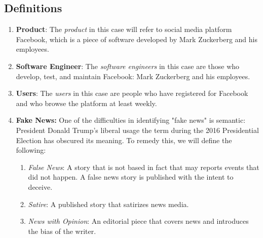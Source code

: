 
\subsection{Definitions}

\begin{enumerate}

\item{\textbf{Product}: The \emph{product} in this case will refer to social media platform Facebook, which is a piece of software developed by Mark Zuckerberg and his employees.
}

\item{\textbf{Software Engineer}: The \emph{software engineers} in this case are those who develop, test, and maintain Facebook: Mark Zuckerberg and his employees.
}

\item{\textbf{Users}: The \emph{users} in this case are people who have registered for Facebook and who browse the platform at least weekly.
}

\item{\textbf{Fake News:} One of the difficulties in identifying "fake news" is semantic: President Donald Trump's liberal usage the term during the 2016 Presidential Election has obscured its meaning. \cite{npr_fake_news} To remedy this, we will define the following:
\begin{enumerate}
    \item{\emph{False News}: A story that is not based in fact that may reports events that did not happen. A false news story is published with the intent to deceive. \cite{ted_becka}}
    \item{\emph{Satire}: A published story that satirizes news media. \cite{ted_becka}}
    \item{\emph{News with Opinion}: An editorial piece that covers news and introduces the bias of the writer. \cite{ted_becka}}
\end{enumerate}
}

\end{enumerate}